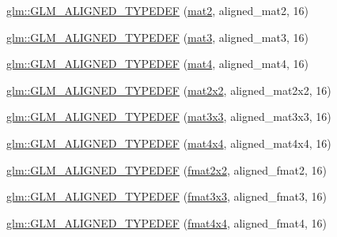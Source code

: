 \begin{DoxyCompactItemize}
\item 
\hyperlink{group__gtx__type__aligned_gafed7d010235a3aa7ea2f88646858f2ae}{glm\+::\+G\+L\+M\+\_\+\+A\+L\+I\+G\+N\+E\+D\+\_\+\+T\+Y\+P\+E\+D\+EF} (\hyperlink{group__core__types_ga8357ec0aab6f8cf69313592492663c3f}{mat2}, aligned\+\_\+mat2, 16)
\item 
\hyperlink{group__gtx__type__aligned_ga17f911ee7b78ca6d1b91c4ab51ddb73c}{glm\+::\+G\+L\+M\+\_\+\+A\+L\+I\+G\+N\+E\+D\+\_\+\+T\+Y\+P\+E\+D\+EF} (\hyperlink{group__core__types_gadfaff2a7dce5cbf4e77a47ecea42ac5b}{mat3}, aligned\+\_\+mat3, 16)
\item 
\hyperlink{group__gtx__type__aligned_ga31940e6012b72110e26fdb0f54805033}{glm\+::\+G\+L\+M\+\_\+\+A\+L\+I\+G\+N\+E\+D\+\_\+\+T\+Y\+P\+E\+D\+EF} (\hyperlink{group__core__types_ga7dcd2365c2e368e6af5b7adeb6a9c8df}{mat4}, aligned\+\_\+mat4, 16)
\item 
\hyperlink{group__gtx__type__aligned_ga01de96cd0b541c52d2b4a3faf65822e9}{glm\+::\+G\+L\+M\+\_\+\+A\+L\+I\+G\+N\+E\+D\+\_\+\+T\+Y\+P\+E\+D\+EF} (\hyperlink{group__core__types_gaeddc14adb4963d9bad73866cc202fb40}{mat2x2}, aligned\+\_\+mat2x2, 16)
\item 
\hyperlink{group__gtx__type__aligned_gac88a191b004bd341e64fc53b5a4d00e3}{glm\+::\+G\+L\+M\+\_\+\+A\+L\+I\+G\+N\+E\+D\+\_\+\+T\+Y\+P\+E\+D\+EF} (\hyperlink{group__core__types_ga6fecca6a869070b6bf8acb44ce1c2af3}{mat3x3}, aligned\+\_\+mat3x3, 16)
\item 
\hyperlink{group__gtx__type__aligned_gabe8c745fa2ced44a600a6e3f19991161}{glm\+::\+G\+L\+M\+\_\+\+A\+L\+I\+G\+N\+E\+D\+\_\+\+T\+Y\+P\+E\+D\+EF} (\hyperlink{group__core__types_ga63e3ee9447ed593484140a9368e738ec}{mat4x4}, aligned\+\_\+mat4x4, 16)
\item 
\hyperlink{group__gtx__type__aligned_ga719da577361541a4c43a2dd1d0e361e1}{glm\+::\+G\+L\+M\+\_\+\+A\+L\+I\+G\+N\+E\+D\+\_\+\+T\+Y\+P\+E\+D\+EF} (\hyperlink{group__gtc__type__precision_gad3b3ab6399b8b960e8994b37521bab86}{fmat2x2}, aligned\+\_\+fmat2, 16)
\item 
\hyperlink{group__gtx__type__aligned_ga6e7ee4f541e1d7db66cd1a224caacafb}{glm\+::\+G\+L\+M\+\_\+\+A\+L\+I\+G\+N\+E\+D\+\_\+\+T\+Y\+P\+E\+D\+EF} (\hyperlink{group__gtc__type__precision_ga5bf6f06e3cac1ed82489f858a0816aaa}{fmat3x3}, aligned\+\_\+fmat3, 16)
\item 
\hyperlink{group__gtx__type__aligned_gae5d672d359f2a39f63f98c7975057486}{glm\+::\+G\+L\+M\+\_\+\+A\+L\+I\+G\+N\+E\+D\+\_\+\+T\+Y\+P\+E\+D\+EF} (\hyperlink{group__gtc__type__precision_gaeda4baa9a8e3113ff879dd5e7bdf5334}{fmat4x4}, aligned\+\_\+fmat4, 16)

\end{DoxyCompactItemize}

